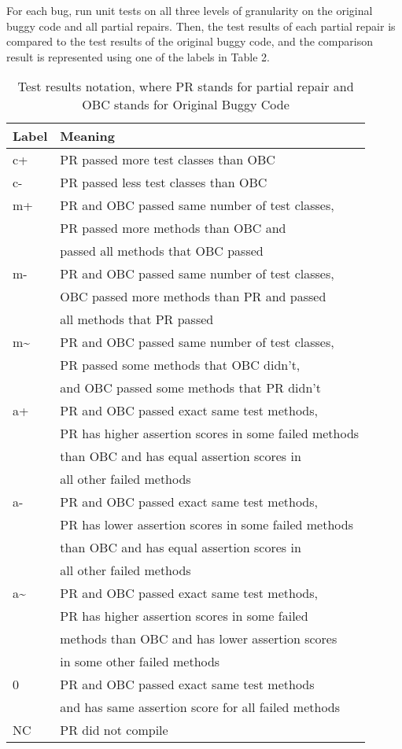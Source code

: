 \documentclass[sigconf, timestamp-false, anonymous=true]{acmart}
\begin{document}
For each bug, run unit tests on all three levels of granularity on the original buggy code and all partial repairs. Then, the test results of each partial repair is compared to the test results of the original buggy code, and the comparison result is represented using one of the labels in Table 2.
\begin{table}
{\begin{center}
\begin{tabular}{| l | l |}
\hline
  Label & Meaning \\
  
  \hline
  c+ & PR passed more test classes than OBC  \\\hline
  c- & PR passed less test classes than OBC  \\\hline
  m+ & PR and OBC passed same number of test classes, \\
  & PR passed more methods than OBC and \\
  & passed all methods that OBC passed\\\hline
  m- & PR and OBC passed same number of test classes, \\
  & OBC passed more methods than PR and passed \\
  & all methods that PR passed\\\hline
  m\~ & PR and OBC passed same number of test classes, \\
  & PR passed some methods that OBC didn't, \\
  & and OBC passed some methods that PR didn't \\\hline
  a+ & PR and OBC passed exact same test methods, \\
  & PR has higher assertion scores in some failed methods \\
  & than OBC and has equal assertion scores in \\
  & all other failed methods \\\hline
  a- & PR and OBC passed exact same test methods, \\
  & PR has lower assertion scores in some failed methods \\
  & than OBC and has equal assertion scores in \\ 
  & all other failed methods \\\hline
  a\~ & PR and OBC passed exact same test methods, \\
  & PR has higher assertion scores in some failed \\
  & methods than OBC and has lower assertion scores \\
  &  in some other failed methods \\\hline
  0 & PR and OBC passed exact same test methods \\
  & and has same assertion score for all failed methods \\ \hline
  NC & PR did not compile \\\hline
 
  
\end{tabular}
\end{center}
}
\caption{Test results notation, where PR stands for partial repair and OBC stands for Original Buggy Code}
\end{table}
\end{document}
